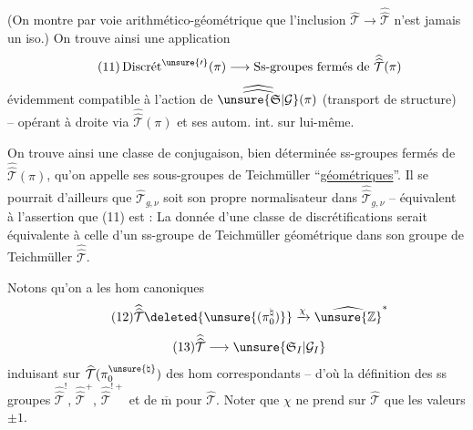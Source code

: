 

(On montre par voie arithmético-géométrique que l'inclusion
$\widehat{\mathcal{T}}\longrightarrow\widehat{\widehat{\mathcal{T}}}$
n'est jamais un iso.) On trouve ainsi une application
\[
\tag{11}
\operatorname{Discr\acute{e}t}^{\unsure{\prime}}(\pi)\longrightarrow
\text{Ss-groupes fermés de }\widehat{\widehat{\mathcal{T}}}(\pi)
\]
évidemment compatible à l'action de
$\widehat{\widehat{\unsure{\mathfrak{S}|\mathcal{G}}}}(\pi)$ (transport de structure) -- opérant
à droite via $\widehat{\widehat{\mathcal{T}}}(\pi)$ et ses autom. int. sur lui-même.

On trouve ainsi une classe de conjugaison, bien déterminée 
ss-groupes fermés de $\widehat{\widehat{\mathcal{T}}}(\pi)$,
qu'on appelle ses sous-groupes de Teichmüller ``\uline{géométriques}''.
Il se pourrait d'ailleurs que $\widehat{\mathcal{T}}_{g,\nu}$ soit
son propre normalisateur dans $\widehat{\widehat{\mathcal{T}}}_{g,\nu}$
-- équivalent à l'assertion que (11) est  :
La donnée d'une classe de discrétifications
serait équivalente à celle d'un ss-groupe de Teichmüller géométrique dans
son groupe de Teichmüller  $\widehat{\widehat{\mathcal{T}}}$.




Notons qu'on a les hom canoniques
\[
\tag{12}
\widehat{\widehat{\mathcal{T}}}\deleted{\unsure{(\pi_0^{\natural})}}
\xrightarrow{\chi}\widehat{\unsure{\mathbb{Z}}}^{*}
\]
\[
\tag{13}
\widehat{\widehat{\mathcal{T}}}\longrightarrow
\unsure{\mathfrak{S}_{I}|\mathcal{G}_{I}}
\]
induisant sur $\widehat{\mathcal{T}}(\pi_0^{\unsure{\natural}})$ des
 hom correspondants -- d'où la définition des
ss groupes $\widehat{\widehat{\mathcal{T}}}^{!}$,
$\widehat{\widehat{\mathcal{T}}}^{+}$,
$\widehat{\widehat{\mathcal{T}}}^{!+}$ et de $\overline{\mathrm m}$ pour
$\widehat{\mathcal{T}}$. Noter que $\chi$ ne prend sur $\widehat{\mathcal{T}}$
que les valeurs $\pm1$.

